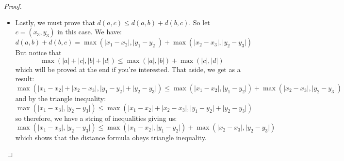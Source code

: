 \documentclass{article}
\begin{document}
\begin{proof}
\begin{itemize}
                \item Lastly, we must prove that $d(a, c) \leq d(a, b) + d(b, c)$. So let $c = (x_{3}, y_{3})$ in this case. We have:
                    \begin{equation*}
                        d(a, b) + d(b, c) = \max(\lvert x_{1} - x_{2} \rvert, \lvert y_{1} - y_{2} \rvert) + \max(\lvert x_{2} - x_{3} \rvert, \lvert y_{2} - y_{3} \rvert)
                    \end{equation*} 
                But notice that 
                    \begin{equation*}
                        \max(\lvert a \rvert + \lvert c \rvert, \lvert b \rvert + \lvert d \rvert) \leq \max(\lvert a \rvert, \lvert b \rvert) + \max(\lvert c \rvert, \lvert d \rvert)
                    \end{equation*}
                which will be proved at the end if you're interested. That aside, we get as a result:
                    \begin{equation*}
                        \max(\lvert x_{1} - x_{2} \rvert + \lvert x_{2} - x_{3} \rvert, \lvert y_{1} - y_{2} \rvert + \lvert y_{2} - y_{3} \rvert) \leq \max(\lvert x_{1} - x_{2} \rvert, \lvert y_{1} - y_{2} \rvert) + \max(\lvert x_{2} - x_{3} \rvert, \lvert y_{2} - y_{3} \rvert)
                    \end{equation*}
                and by the triangle inequality:
                    \begin{equation*}
                        \max(\lvert x_{1} - x_{3} \rvert, \lvert y_{2} - y_{3} \rvert) \leq \max(\lvert x_{1} - x_{2} \rvert + \lvert x_{2} - x_{3} \rvert, \lvert y_{1} - y_{2} \rvert + \lvert y_{2} - y_{3} \rvert)
                    \end{equation*}
                so therefore, we have a string of inequalities giving us:
                    \begin{equation*}
                        \max(\lvert x_{1} - x_{3} \rvert, \lvert y_{2} - y_{3} \rvert) \leq \max(\lvert x_{1} - x_{2} \rvert, \lvert y_{1} - y_{2} \rvert) + \max(\lvert x_{2} - x_{3} \rvert, \lvert y_{2} - y_{3} \rvert)
                    \end{equation*}
                which shows that the distance formula obeys triangle inequality.


\end{itemize}
\end{proof}
\end{document}
